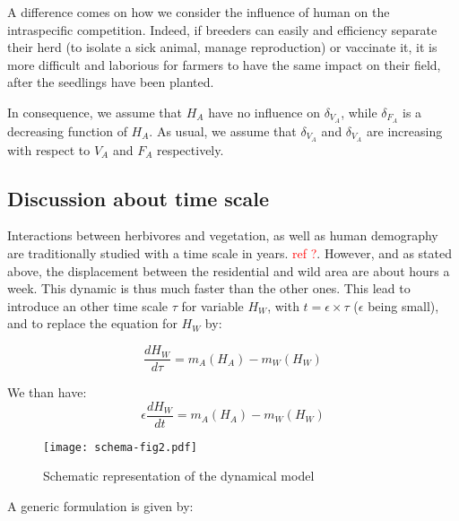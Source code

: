 \documentclass{article}
\newcommand{\lfw}{\lambda_{F}}
\newcommand{\lvw}{\lambda_{V}}
\newcommand{\marc}[1]{\textcolor{red}{#1}}
\begin{document}
A difference comes on how we consider the influence of human on the intraspecific competition. Indeed, if breeders can easily and efficiency separate their herd (to isolate a sick animal, manage reproduction) or vaccinate it, it is more difficult and laborious for farmers to have the same impact on their field, after the seedlings have been planted.

In consequence, we assume that $H_A$ have no influence on $\delta_{V_A}$, while $\delta_{F_A}$ is a decreasing function of $H_A$. As usual, we assume that $\delta_{V_A}$ and $\delta_{V_A}$ are increasing with respect to $V_A$ and $F_A$ respectively.


\subsection{Discussion about time scale}
Interactions between herbivores and vegetation, as well as human demography are traditionally studied with a time scale in years. \marc{ref ?}. However, and as stated above, the displacement between the residential and wild area are about hours a week. This dynamic is thus much faster than the other ones. This lead to introduce an other time scale $\tau$ for variable $H_W$, with $t = \epsilon \times \tau$ ($\epsilon$ being small), and to replace the equation for $H_W$ by:

\begin{equation*}
\dfrac{dH_W}{d\tau} = m_A(H_A) - m_W(H_W)
\end{equation*}


We than have:
\begin{equation*}
\epsilon \dfrac{dH_W}{dt} = m_A(H_A) - m_W(H_W)
\end{equation*}

\begin{figure}[!ht]
\centering
\texttt{[image: schema-fig2.pdf]}
\caption{Schematic representation of the dynamical model}
\end{figure}

A generic formulation is given by:

%
\end{document}
